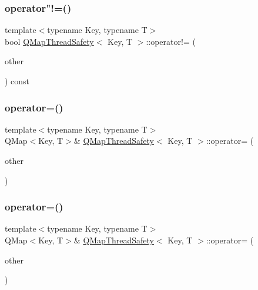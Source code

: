 \subsubsection{\texorpdfstring{operator"!=()}{operator!=()}}
{\footnotesize\ttfamily template$<$typename Key, typename T$>$ \\
bool \hyperlink{class_q_map_thread_safety}{Q\+Map\+Thread\+Safety}$<$ Key, T $>$\+::operator!= (\begin{DoxyParamCaption}\item[{const Q\+Map$<$ Key, T $>$ \&}]{other }\end{DoxyParamCaption}) const\hspace{0.3cm}{\ttfamily [inline]}}

\mbox{\label{class_q_map_thread_safety_af33ed0b71924a4281f4f25bf5eda1cfd}} 
\subsubsection{\texorpdfstring{operator=()}{operator=()}\hspace{0.1cm}{\footnotesize\ttfamily [1/2]}}
{\footnotesize\ttfamily template$<$typename Key, typename T$>$ \\
Q\+Map$<$Key, T$>$\& \hyperlink{class_q_map_thread_safety}{Q\+Map\+Thread\+Safety}$<$ Key, T $>$\+::operator= (\begin{DoxyParamCaption}\item[{const Q\+Map$<$ Key, T $>$ \&}]{other }\end{DoxyParamCaption})\hspace{0.3cm}{\ttfamily [inline]}}

\mbox{\label{class_q_map_thread_safety_a0845272b1bc863dd153607e63efa839d}} 
\subsubsection{\texorpdfstring{operator=()}{operator=()}\hspace{0.1cm}{\footnotesize\ttfamily [2/2]}}
{\footnotesize\ttfamily template$<$typename Key, typename T$>$ \\
Q\+Map$<$Key, T$>$\& \hyperlink{class_q_map_thread_safety}{Q\+Map\+Thread\+Safety}$<$ Key, T $>$\+::operator= (\begin{DoxyParamCaption}\item[{Q\+Map$<$ Key, T $>$ \&\&}]{other }\end{DoxyParamCaption})\hspace{0.3cm}{\ttfamily [inline]}}

